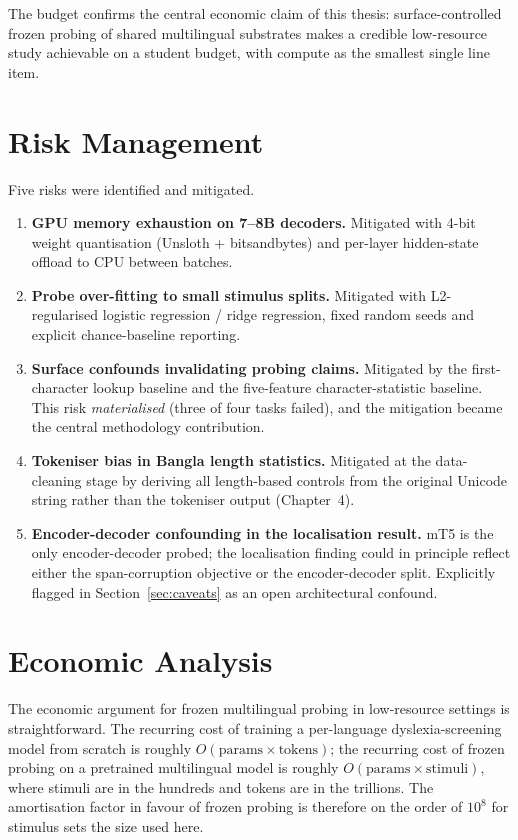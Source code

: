 The budget confirms the central economic claim of this thesis: surface-controlled frozen probing of shared multilingual substrates makes a credible low-resource study achievable on a student budget, with compute as the smallest single line item.

\section{Risk Management}

Five risks were identified and mitigated.

\begin{enumerate}
    \item \textbf{GPU memory exhaustion on 7--8B decoders.} Mitigated with 4-bit weight quantisation (Unsloth + bitsandbytes) and per-layer hidden-state offload to CPU between batches.
    \item \textbf{Probe over-fitting to small stimulus splits.} Mitigated with L2-regularised logistic regression / ridge regression, fixed random seeds and explicit chance-baseline reporting.
    \item \textbf{Surface confounds invalidating probing claims.} Mitigated by the first-character lookup baseline and the five-feature character-statistic baseline. This risk \emph{materialised} (three of four tasks failed), and the mitigation became the central methodology contribution.
    \item \textbf{Tokeniser bias in Bangla length statistics.} Mitigated at the data-cleaning stage by deriving all length-based controls from the original Unicode string rather than the tokeniser output (Chapter~4).
    \item \textbf{Encoder-decoder confounding in the localisation result.} mT5 is the only encoder-decoder probed; the localisation finding could in principle reflect either the span-corruption objective or the encoder-decoder split. Explicitly flagged in Section~\ref{sec:caveats} as an open architectural confound.
\end{enumerate}

\section{Economic Analysis}
\label{sec:economic}

The economic argument for frozen multilingual probing in low-resource settings is straightforward. The recurring cost of training a per-language dyslexia-screening model from scratch is roughly $O(\text{params} \times \text{tokens})$; the recurring cost of frozen probing on a pretrained multilingual model is roughly $O(\text{params} \times \text{stimuli})$, where stimuli are in the hundreds and tokens are in the trillions. The amortisation factor in favour of frozen probing is therefore on the order of $10^{8}$ for stimulus sets the size used here.

